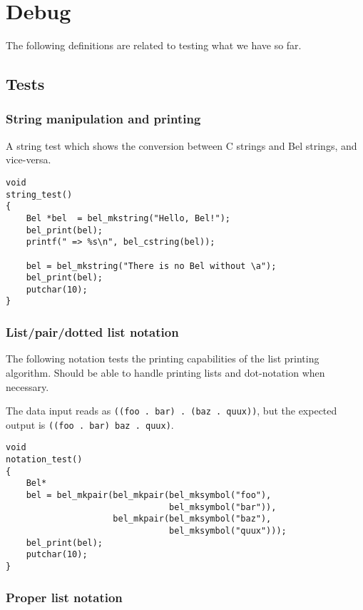 \documentclass[openright,a4paper,twoside,12pt]{memoir}
\begin{document}
\chapter{Debug}
\label{sec:org9896d5e}

The following definitions are related to testing what we have so
far.

\section{Tests}
\label{sec:org53b3dca}
\subsection{String manipulation and printing}
\label{sec:orgacd0612}

A string test which shows the conversion between C strings and Bel
strings, and vice-versa.

\begin{verbatim}
void
string_test()
{
    Bel *bel  = bel_mkstring("Hello, Bel!");
    bel_print(bel);
    printf(" => %s\n", bel_cstring(bel));

    bel = bel_mkstring("There is no Bel without \a");
    bel_print(bel);
    putchar(10);
}
\end{verbatim}

\subsection{List/pair/dotted list notation}
\label{sec:orgcc375cd}

The following notation tests the printing capabilities of the list
printing algorithm. Should be able to handle printing lists and
dot-notation when necessary.

The data input reads as \texttt{((foo . bar) . (baz . quux))}, but the expected
output is \texttt{((foo . bar) baz . quux)}.

\begin{verbatim}
void
notation_test()
{
    Bel*
    bel = bel_mkpair(bel_mkpair(bel_mksymbol("foo"),
                                bel_mksymbol("bar")),
                     bel_mkpair(bel_mksymbol("baz"),
                                bel_mksymbol("quux")));
    bel_print(bel);
    putchar(10);
}
\end{verbatim}

\subsection{Proper list notation}
\label{sec:org30f4319}
\end{document}
